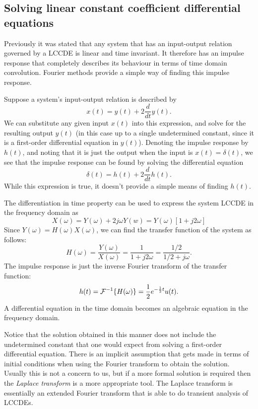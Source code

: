 \documentclass[10pt]{beamer}
\begin{document}
\subsection{Solving linear constant coefficient differential equations}

Previously it was stated that any system that has an input-output relation governed by a LCCDE is linear and time invariant.  It therefore has an impulse response that completely describes its behaviour in terms of time domain convolution.  Fourier methods provide a simple way of finding this impulse response.

Suppose a system's input-output relation is described by 
\begin{equation*}
  x(t) = y(t) + 2 \frac{d}{dt} y(t).
\end{equation*}
We can substitute any given input $x(t)$ into this expression, and solve for the resulting output $y(t)$ (in this case up to a single undetermined constant, since it is a first-order differential equation in $y(t)$).  Denoting the impulse response by $h(t)$, and noting that it is just the output when the input is $x(t) = \delta(t)$, we see that the impulse response can be found by solving the differential equation
\begin{equation*}
  \delta(t) = h(t) + 2 \frac{d}{dt} h(t).
\end{equation*}
While this expression is true, it doesn't provide a simple means of finding $h(t)$.

The differentiation in time property can be used to express the system LCCDE in the frequency domain as
\begin{equation*}
  X(\omega) = Y(\omega) + 2 j \omega Y(w) = Y(\omega) [1 + j 2 \omega]
\end{equation*}
Since $Y(\omega) = H(\omega) X(\omega)$, we can find the transfer function of the system as follows:
\begin{equation*}
  H(\omega) = \frac{Y(\omega)}{X(\omega)} = \frac{1}{1 + j 2 \omega}
  = \frac{1/2}{1/2 + j \omega}.
\end{equation*}
The impulse response is just the inverse Fourier transform of the transfer function:
\begin{equation*}
  h(t) = {\cal F}^{-1} \{ H(\omega) \} = \frac{1}{2} e^{-\frac{1}{2} t} u(t).
\end{equation*}
A differential equation in the time domain becomes an algebraic equation in the frequency domain.

Notice that the solution obtained in this manner does not include the undetermined constant that one would expect from solving a first-order differential equation.  There is an implicit assumption that gets made in terms of initial conditions when using the Fourier transform to obtain the solution.  Usually this is not a concern to us, but if a more formal solution is required then the {\em Laplace transform} is a more appropriate tool.  The Laplace transform is essentially an extended Fourier transform that is able to do transient analysis of LCCDEs.
\end{document}

